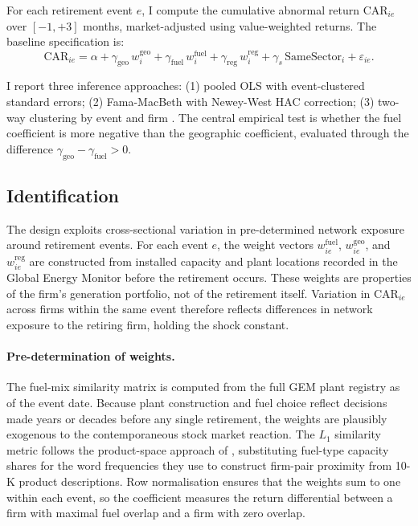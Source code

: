 \documentclass[12pt,a4paper]{article}
\begin{document}
For each retirement event $e$, I compute the cumulative abnormal return $\text{CAR}_{ie}$ over $[-1, +3]$ months, market-adjusted using value-weighted returns. The baseline specification is:
\begin{equation}\label{eq:baseline}
    \text{CAR}_{ie} = \alpha + \gamma_{\text{geo}}\, w^{\text{geo}}_i + \gamma_{\text{fuel}}\, w^{\text{fuel}}_i + \gamma_{\text{reg}}\, w^{\text{reg}}_i + \gamma_s\, \text{SameSector}_i + \varepsilon_{ie}.
\end{equation}

I report three inference approaches: (1) pooled OLS with event-clustered standard errors; (2) Fama-MacBeth with Newey-West HAC correction; (3) two-way clustering by event and firm \citep{CameronGelbachMiller2011}. The central empirical test is whether the fuel coefficient is more negative than the geographic coefficient, evaluated through the difference $\gamma_{\text{geo}} - \gamma_{\text{fuel}} > 0$.

\subsection{Identification}\label{sec:identification}

The design exploits cross-sectional variation in pre-determined network exposure around retirement events. For each event $e$, the weight vectors $w^{\text{fuel}}_{ie}$, $w^{\text{geo}}_{ie}$, and $w^{\text{reg}}_{ie}$ are constructed from installed capacity and plant locations recorded in the Global Energy Monitor before the retirement occurs. These weights are properties of the firm's generation portfolio, not of the retirement itself. Variation in $\text{CAR}_{ie}$ across firms within the same event therefore reflects differences in network exposure to the retiring firm, holding the shock constant.

\paragraph{Pre-determination of weights.}
The fuel-mix similarity matrix is computed from the full GEM plant registry as of the event date. Because plant construction and fuel choice reflect decisions made years or decades before any single retirement, the weights are plausibly exogenous to the contemporaneous stock market reaction. The $L_1$ similarity metric follows the product-space approach of \citet{HobergPhillips2016}, substituting fuel-type capacity shares for the word frequencies they use to construct firm-pair proximity from 10-K product descriptions. Row normalisation ensures that the weights sum to one within each event, so the coefficient measures the return differential between a firm with maximal fuel overlap and a firm with zero overlap.
\end{document}

